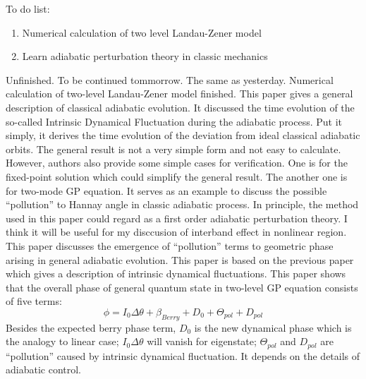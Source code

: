 \documentclass[fontsize=11pt, %
                             paper=a4, %
                             twoside, %
                             captions=tableheading,
                             index=totoc,
                             hyperref]{labbook}
\begin{document}
\begin{addmargin}[4cm]{0cm}
To do list:
\begin{enumerate}
\item
Numerical calculation of two level Landau-Zener model
\item
Learn adiabatic perturbation theory in classic mechanics
\end{enumerate}
Unfinished. To be continued tommorrow.
The same as yesterday. Numerical calculation of two-level Landau-Zener model finished.
This paper gives a general description of classical adiabatic evolution. It discussed the time evolution of the so-called Intrinsic Dynamical Fluctuation during the adiabatic process. Put it simply, it derives the time evolution of the deviation from ideal classical adiabatic orbits. The general result is not a very simple form and not easy to calculate. However, authors also provide some simple cases for verification. One is for the fixed-point solution which could simplify the general result. The another one is for two-mode GP equation. It serves as an example to discuss the possible ``pollution'' to Hannay angle in classic adiabatic process. In principle, the method used in this paper could regard as a first order adiabatic perturbation theory. I think it will be useful for my disccusion of interband effect in nonlinear region.
This paper discusses the emergence of ``pollution'' terms to geometric phase arising in general adiabatic evolution. This paper is based on the previous paper\cite{Zhang20121202} which gives a description of intrinsic dynamical fluctuations. This paper shows that the overall phase of general quantum state in two-level GP equation consists of five terms:
\begin{equation}
\phi=I_0\Delta \theta + \beta_{Berry}+D_0+\Theta_{pol}+D_{pol}
\end{equation}
Besides the expected berry phase term, $D_0$ is the new dynamical phase which is the analogy to linear case; $I_0\Delta \theta$ will vanish for eigenstate; $\Theta_{pol}$ and $D_{pol}$ are ``pollution'' caused by intrinsic dynamical fluctuation. It depends on the details of adiabatic control.\\

\end{addmargin}
\end{document}
